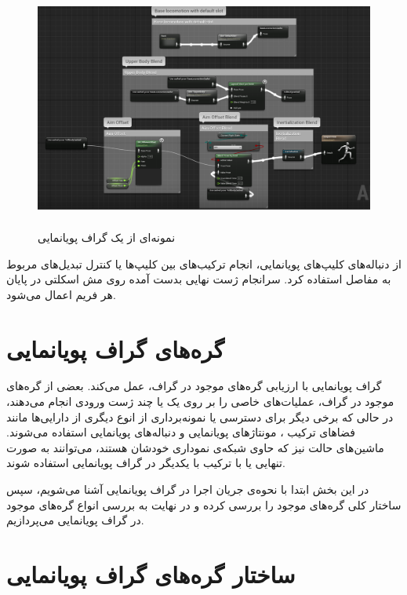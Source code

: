 \begin{figure}[ht]
	\centerline{\includegraphics[width=\textwidth,height=8cm,keepaspectratio]{Figures/Ch3/AnimationGraph.png}}

	\caption{نمونه‌ای از یک گراف پویانمایی}
	\label{fig:AnimationGraph}
\end{figure}





از دنباله‌های کلیپ‌های پویانمایی،
انجام ترکیب‌های بین کلیپ‌ها 
یا کنترل تبدیل‌های مربوط به مفاصل استفاده کرد.
سرانجام ژست نهایی بدست آمده روی 
مش اسکلتی در پایان هر فریم اعمال می‌شود.

\section{گره‌های گراف پویانمایی }

گراف پویا‌نمایی با ارزیابی گره‌های موجود در گراف، عمل می‌کند.
بعضی از گره‌های موجود در گراف، عملیات‌های خاصی را بر روی یک یا چند
ژست ورودی انجام می‌دهند، در حالی که برخی دیگر 
برای دسترسی یا نمونه‌برداری از انوع دیگری از دارایی‌ها مانند
فضاهای ترکیب
، مونتاژهای پویانمایی
و دنباله‌های پویا‌نمایی
استفاده می‌شوند.
ماشین‌های حالت نیز که حاوی شبکه‌ی نموداری خودشان هستند، می‌توانند 
به صورت تنهایی یا با ترکیب با یکدیگر در 
گراف پویانمایی استفاده شوند.

در این بخش ابتدا با نحوه‌‌ی جریان اجرا در گراف پویانمایی 
آشنا می‌شویم، سپس ساختار کلی گره‌های موجود را بررسی کرده و در نهایت 
به بررسی انواع گره‌‌های موجود در گراف پویانمایی می‌پردازیم.



\section{ساختار گره‌های گراف پویانمایی}

